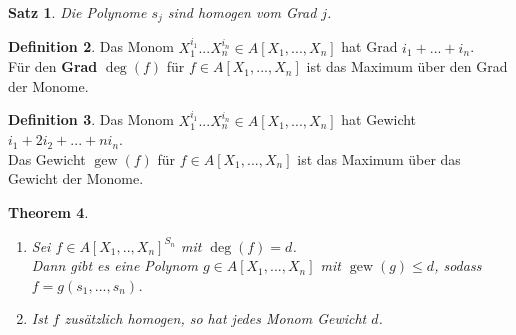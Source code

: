 \documentclass[10pt,a4paper]{article}
\newcommand{\weight}{\operatorname{gew}}
\theoremstyle{plain}
\newtheorem{theorem}{Theorem}[section]
\newtheorem{satz}[theorem]{Satz}
\theoremstyle{definition}
\newtheorem{definition}[theorem]{Definition}
\theoremstyle{remark}
\begin{document}
	\begin{satz}
		Die Polynome $s_j$ sind homogen vom Grad $j$.\\
	\end{satz}

	\begin{definition}
		Das Monom $X_1^{i_1}...X_n^{i_n}\in A[X_1,...,X_n]$ hat Grad $i_1+...+i_n$.\\
		Für den \textbf{Grad} $\deg(f)$ für $f\in A[X_1,...,X_n]$ ist das Maximum über den Grad der Monome.
	\end{definition}

	\begin{definition}
		Das Monom $X_1^{i_1}...X_n^{i_n}\in A[X_1,...,X_n]$ hat Gewicht $i_1+2i_2+...+ni_n$.\\
		Das Gewicht $\weight(f)$ für $f\in A[X_1,...,X_n]$ ist das Maximum über das Gewicht der Monome.
	\end{definition}

	\begin{theorem}
		\begin{enumerate}
			\item Sei $f\in A[X_1,..,X_n]^{S_n}$ mit  $\deg(f)=d$.\\
			Dann gibt es eine Polynom $g\in A[X_1,...,X_n]$ mit $\weight(g)\leq d$, sodass $f=g(s_1,...,s_n)$.\\
			\item Ist $f$ zusätzlich homogen, so hat jedes Monom Gewicht $d$.
		\end{enumerate}

	\end{theorem}
\end{document}
